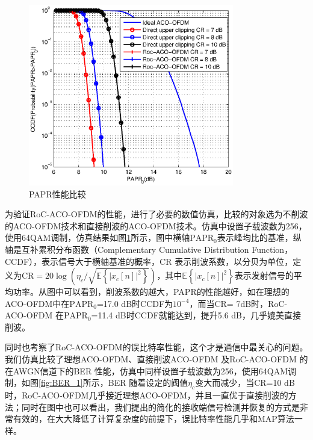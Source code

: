 \begin{figure}[htbp]
    \centering
    \includegraphics[width=0.8\textwidth]{figures/chapter-2/CCDF.eps}
    \caption{PAPR性能比较}
    \label{fig:CCDF}
\end{figure}

为验证RoC-ACO-OFDM的性能，进行了必要的数值仿真，比较的对象选为不削波的ACO-OFDM技术和直接削波的ACO-OFDM技术。仿真中设置子载波数为256，使用64QAM调制，仿真结果如图\ref{fig:CCDF}所示，图中横轴$\text{PAPR}_0$表示峰均比的基准，纵轴是互补累积分布函数（Complementary Cumulative Distribution Function，CCDF），表示信号大于横轴基准的概率，CR 表示削波系数，以分贝为单位，定义为CR$= 20 \log \left( \eta_c / \sqrt{\mathbb{E} \left\{ |x_c[n]|^2 \right\} } \right)$，其中$\mathbb{E} \left\{ |x_c[n]|^2 \right\}$表示发射信号的平均功率。从图中可以看到，削波系数的越大，PAPR的性能越好，如在理想的ACO-OFDM中在$\text{PAPR}_0$=17.0 dB时CCDF为$10^{-4}$，而当CR= 7dB时，RoC-ACO-OFDM 在$\text{PAPR}_0$=11.4 dB时CCDF就能达到，提升5.6 dB，几乎媲美直接削波。

同时也考察了RoC-ACO-OFDM的误比特率性能，这个才是通信中最关心的问题。我们仿真比较了理想ACO-OFDM、直接削波ACO-OFDM 及RoC-ACO-OFDM 的在AWGN信道下的BER 性能，仿真中同样设置子载波数为256，使用64QAM调制，如图\ref{fig:BER_1}所示，BER 随着设定的阀值$\eta_c$变大而减少，当CR=10 dB 时，RoC-ACO-OFDM几乎接近理想ACO-OFDM，并且一直优于直接削波的方法；同时在图中也可以看出，我们提出的简化的接收端信号检测并恢复的方式是非常有效的，在大大降低了计算复杂度的前提下，误比特率性能几乎和MAP算法一样。


